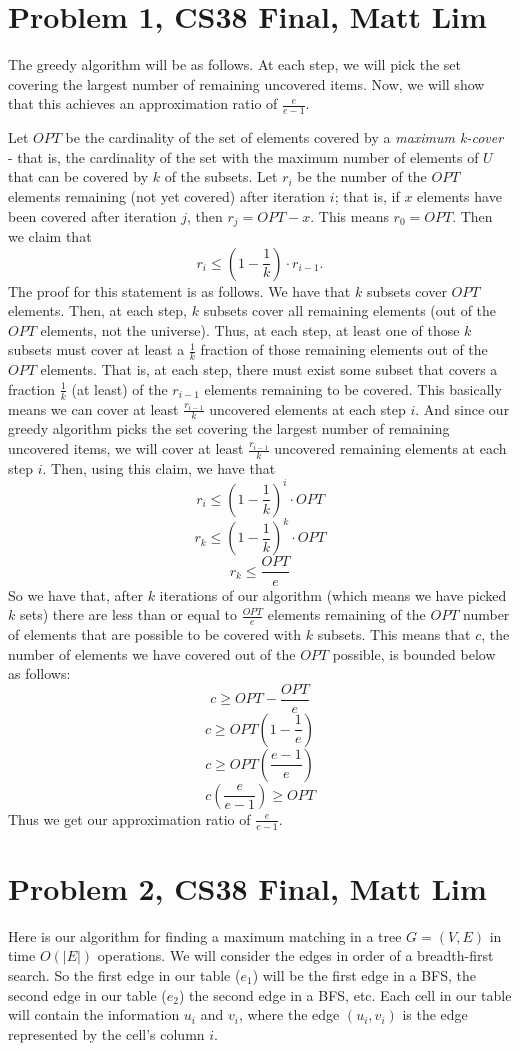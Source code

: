 \documentclass{article}
\begin{document}
\section*{Problem 1, CS38 Final, Matt Lim}
The greedy algorithm will be as follows. At each step, we will pick the set
covering the largest number of remaining uncovered items. Now, we will show that
this achieves an approximation ratio of $\frac{e}{e-1}$.

Let $OPT$ be the cardinality of the set of elements covered by a
\textit{maximum k-cover} - that is, the cardinality of the set
with the maximum number of elements of $U$ that can be covered by $k$ of the
subsets. Let $r_i$ be the number of the $OPT$ elements remaining (not yet
covered) after iteration $i$; that is, if $x$ elements have been covered after
iteration $j$, then $r_j = OPT - x$. This means $r_0 = OPT$. Then we claim that
\[ r_i \leq (1 - \frac{1}{k}) \cdot r_{i-1}. \]
The proof for this statement is as follows. We have
that $k$ subsets cover $OPT$ elements. Then, at each step, $k$ subsets cover
all remaining elements (out of the $OPT$ elements, not the universe).
Thus, at each step, at least one of those $k$ subsets must cover at least a $\frac{1}{k}$
fraction of those remaining elements out of the $OPT$ elements. That is, at
each step, there
must exist some subset that covers a fraction $\frac{1}{k}$ (at least) of the $r_{i-1}$
elements remaining to be covered. This basically means we can cover at least
$\frac{r_{i-1}}{k}$ uncovered elements at each step $i$. And since our
greedy algorithm picks the set covering the largest number of remaining
uncovered items, we will cover at least $\frac{r_{i-1}}{k}$ uncovered remaining
elements at each step $i$. Then, using this claim, we have that
\[ r_i \leq (1 - \frac{1}{k})^i \cdot OPT \]
\[ r_k \leq (1 - \frac{1}{k})^k \cdot OPT \]
\[ r_k \leq \frac{OPT}{e} \]
So we have that, after $k$ iterations of our algorithm (which means we have
picked $k$ sets) there are less than or equal to $\frac{OPT}{e}$ elements
remaining of the $OPT$ number of elements that are possible to be covered with
$k$ subsets. This means that $c$, the number of elements we have
covered out of the $OPT$ possible, is bounded below as follows:
\[ c \geq OPT - \frac{OPT}{e} \]
\[ c \geq OPT(1 - \frac{1}{e}) \]
\[ c \geq OPT(\frac{e-1}{e}) \]
\[ c(\frac{e}{e-1}) \geq OPT \]
Thus we get our approximation ratio of $\frac{e}{e-1}$.
\newpage

\section*{Problem 2, CS38 Final, Matt Lim}
Here is our algorithm for finding a maximum matching in a tree $G = (V,E)$ in
time $O(|E|)$ operations. We will consider the edges in order of a breadth-first
search. So the first edge in our table ($e_1$) will be the first edge in a BFS, the
second edge in our table ($e_2$) the second edge in a BFS, etc. Each cell in our table
will contain the information $u_i$ and $v_i$, where the edge $(u_i,v_i)$ is the edge
represented by the cell's column $i$.
\end{document}
